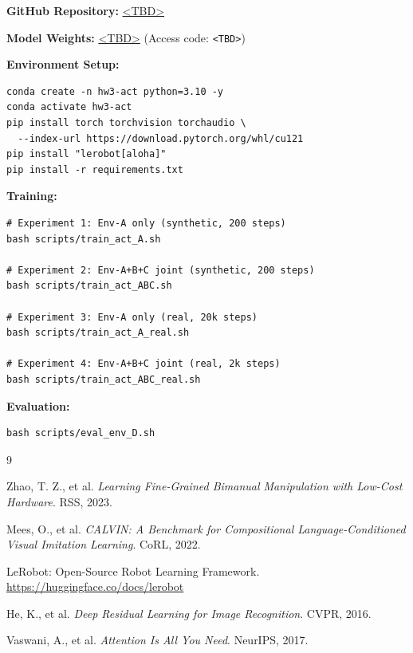 \documentclass[10pt,twocolumn]{article}
\begin{document}
\textbf{GitHub Repository:} \url{<TBD>}

\textbf{Model Weights:} \url{<TBD>} (Access code: \texttt{<TBD>})

\textbf{Environment Setup:}
\begin{verbatim}
conda create -n hw3-act python=3.10 -y
conda activate hw3-act
pip install torch torchvision torchaudio \
  --index-url https://download.pytorch.org/whl/cu121
pip install "lerobot[aloha]"
pip install -r requirements.txt
\end{verbatim}

\textbf{Training:}
\begin{verbatim}
# Experiment 1: Env-A only (synthetic, 200 steps)
bash scripts/train_act_A.sh

# Experiment 2: Env-A+B+C joint (synthetic, 200 steps)
bash scripts/train_act_ABC.sh

# Experiment 3: Env-A only (real, 20k steps)
bash scripts/train_act_A_real.sh

# Experiment 4: Env-A+B+C joint (real, 2k steps)
bash scripts/train_act_ABC_real.sh
\end{verbatim}

\textbf{Evaluation:}
\begin{verbatim}
bash scripts/eval_env_D.sh
\end{verbatim}

\begin{thebibliography}{9}

Zhao, T. Z., et al.
\textit{Learning Fine-Grained Bimanual Manipulation with Low-Cost Hardware}.
RSS, 2023.

Mees, O., et al.
\textit{CALVIN: A Benchmark for Compositional Language-Conditioned Visual Imitation Learning}.
CoRL, 2022.

LeRobot: Open-Source Robot Learning Framework.
\url{https://huggingface.co/docs/lerobot}

He, K., et al.
\textit{Deep Residual Learning for Image Recognition}.
CVPR, 2016.

Vaswani, A., et al.
\textit{Attention Is All You Need}.
NeurIPS, 2017.

\end{thebibliography}
\end{document}

